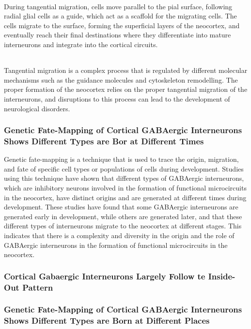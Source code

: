 \begin{itemize}
\begin{itemize}
\\During tangential migration, cells move parallel to the pial surface, following radial glial cells as a guide, which act as a scaffold for the migrating cells. The cells migrate to the surface, forming the superficial layers of the neocortex, and eventually reach their final destinations where they differentiate into mature interneurons and integrate into the cortical circuits.

\\Tangential migration is a complex process that is regulated by different molecular mechanisms such as the guidance molecules and cytoskeleton remodelling. The proper formation of the neocortex relies on the proper tangential migration of the interneurons, and disruptions to this process can lead to the development of neurological disorders.
\subsubsection{Genetic Fate-Mapping of Cortical GABAergic Interneurons Shows Different Types are Bor at Different Times}
Genetic fate-mapping is a technique that is used to trace the origin, migration, and fate of specific cell types or populations of cells during development. Studies using this technique have shown that different types of GABAergic interneurons, which are inhibitory neurons involved in the formation of functional microcircuits in the neocortex, have distinct origins and are generated at different times during development. These studies have found that some GABAergic interneurons are generated early in development, while others are generated later, and that these different types of interneurons migrate to the neocortex at different stages. This indicates that there is a complexity and diversity in the origin and the role of GABAergic interneurons in the formation of functional microcircuits in the neocortex.
\subsubsection{Cortical Gabaergic Interneurons Largely Follow te Inside-Out Pattern}
\subsubsection{Genetic Fate-Mapping of Cortical GABAergic Interneurons Shows Different Types are Born at Different Places}


\end{itemize}
\end{itemize}
